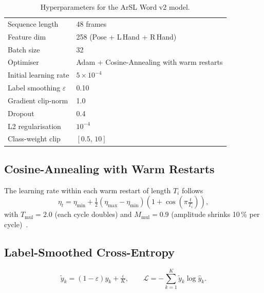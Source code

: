 \begin{table}[H]\centering
  \caption{Hyperparameters for the ArSL Word v2 model.}\label{tab:m4}
  \begin{tabular}{l l}\toprule
    Sequence length         & 48 frames \\
    Feature dim             & 258 (Pose + L\,Hand + R\,Hand) \\
    Batch size              & 32 \\
    Optimiser               & Adam + Cosine-Annealing with warm restarts \\
    Initial learning rate   & $5 \times 10^{-4}$ \\
    Label smoothing $\varepsilon$ & 0.10 \\
    Gradient clip-norm      & 1.0 \\
    Dropout                 & 0.4 \\
    L2 regularisation       & $10^{-4}$ \\
    Class-weight clip       & $[0.5,\,10]$ \\\bottomrule
  \end{tabular}
\end{table}

\subsection{Cosine-Annealing with Warm Restarts}
\label{sec:meth:cosine}

The learning rate within each warm restart of length $T_i$ follows
\begin{equation}
  \eta_t = \eta_{\min} + \tfrac{1}{2}(\eta_{\max} - \eta_{\min})
           \!\left(1 + \cos\!\left(\pi \tfrac{t}{T_i}\right)\right),
  \label{eq:cosine}
\end{equation}
with $T_{\text{mul}} = 2.0$ (each cycle doubles) and $M_{\text{mul}} = 0.9$
(amplitude shrinks 10\,\% per cycle)~\cite{loshchilov2017sgdr}.

\subsection{Label-Smoothed Cross-Entropy}
\label{sec:meth:smooth}

\begin{equation}
  \tilde y_k = (1-\varepsilon) y_k + \tfrac{\varepsilon}{K},\qquad
  \mathcal{L} = -\sum_{k=1}^{K} \tilde y_k \log \hat y_k .
  \label{eq:smooth}
\end{equation}

